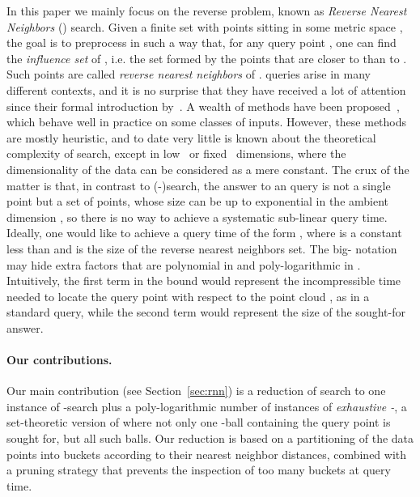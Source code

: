 In this paper we mainly focus on the reverse problem, known as {\em
  Reverse Nearest Neighbors} (\rnn) search. Given a finite set 
with  points sitting in some metric space , the goal is to
preprocess  in such a way that, for any query point , one
can find the {\em influence set} of , i.e. the set 
formed by the points  that are closer to 
than to . Such points are called {\em reverse
  nearest neighbors} of .  \rnn queries arise in many different
contexts, and it is no surprise that they have
received a lot of attention since their formal introduction
by~\citet{KM00}. A wealth of methods have been
proposed~\citep{ABKKPR06,BJKS06,Clarkson03,FP09,
  KMSXZ07,KM00,KJG08,SFT03,SAA00,TPL04,TYM06}, which behave well in
practice on some classes of inputs. However, these methods are mostly
heuristic, and to date very little is known about the theoretical
complexity of \rnn search, except in low~\citep{CDLSV09,MVZ02} or
fixed~\citep{CVY09} dimensions, where the dimensionality of the data
can be considered as a mere constant. The crux of the matter is that,
in contrast to (-)\nn search, the answer to an \rnn query is not a
single point but a set of points, whose size can be up to exponential
in the ambient dimension \citep{PZ04}, so there is no way to achieve a
systematic sub-linear query time. Ideally, one would like to achieve a
query time of the form , where
 is a constant less than  and  is the size
of the reverse nearest neighbors set. The big- notation may
hide extra factors that are polynomial in  and
poly-logarithmic in .  Intuitively, the first term in the bound
would represent the incompressible time needed to locate the query
point  with respect to the point cloud , as in a standard \nn
query, while the second term would represent the size of the
sought-for answer.

\paragraph*{Our contributions.}
Our main contribution (see Section~\ref{sec:rnn}) is a reduction of
\rnn search to one instance of -\nn search plus a poly-logarithmic
number of instances of {\em exhaustive -\pleb}, 
a set-theoretic version of \pleb where not only one -ball
containing the query point  is sought for, but all such balls. Our
reduction is based on a partitioning of the data points into buckets
according to their nearest neighbor distances, combined with a pruning
strategy that prevents the inspection of too many buckets at query
time.

